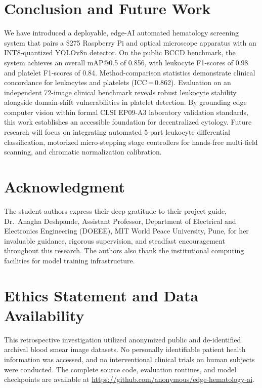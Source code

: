 \documentclass[10pt,conference]{IEEEtran}
\begin{document}
\section{Conclusion and Future Work}
\label{sec:conclusion}
We have introduced a deployable, edge-AI automated hematology screening system that pairs a \$275 Raspberry Pi and optical microscope apparatus with an INT8-quantized YOLOv8n detector. On the public BCCD benchmark, the system achieves an overall mAP@0.5 of 0.856, with leukocyte F1-scores of 0.98 and platelet F1-scores of 0.84. Method-comparison statistics demonstrate clinical concordance for leukocytes and platelets (ICC\,=\,0.862). Evaluation on an independent 72-image clinical benchmark reveals robust leukocyte stability alongside domain-shift vulnerabilities in platelet detection. By grounding edge computer vision within formal CLSI EP09-A3 laboratory validation standards, this work establishes an accessible foundation for decentralized cytology. Future research will focus on integrating automated 5-part leukocyte differential classification, motorized micro-stepping stage controllers for hands-free multi-field scanning, and chromatic normalization calibration.

\section*{Acknowledgment}
The student authors express their deep gratitude to their project guide, Dr.~Anagha Deshpande, Assistant Professor, Department of Electrical and Electronics Engineering (DOEEE), MIT World Peace University, Pune, for her invaluable guidance, rigorous supervision, and steadfast encouragement throughout this research. The authors also thank the institutional computing facilities for model training infrastructure.

\section*{Ethics Statement and Data Availability}
This retrospective investigation utilized anonymized public and de-identified archival blood smear image datasets. No personally identifiable patient health information was accessed, and no interventional clinical trials on human subjects were conducted. The complete source code, evaluation routines, and model checkpoints are available at \url{https://github.com/anonymous/edge-hematology-ai}.

\balance


\end{document}
